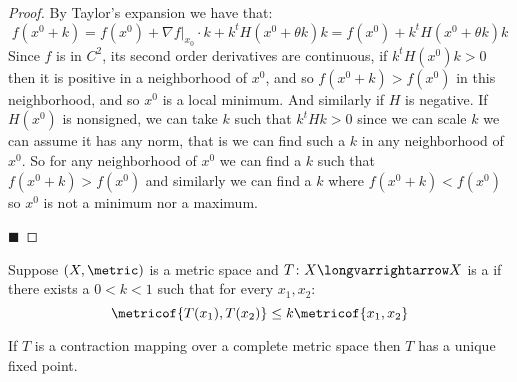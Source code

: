 \documentclass[10pt]{article}
\begin{document}
\begin{proof}

    By Taylor's expansion we have that:
    \[ f(x^0+k) = f(x^0) + \nabla f\bigl|_{x_0}\cdot k + k^tH(x^0+\theta k)k = f(x^0) + k^tH(x^0+\theta k)k \]
    Since $f$ is in $C^2$, its second order derivatives are continuous, if $k^tH(x^0)k>0$ then it is positive in a neighborhood of $x^0$, and so $f(x^0+k)>f(x^0)$ in this neighborhood, and so $x^0$ is a
    local minimum.
    And similarly if $H$ is negative.
    If $H(x^0)$ is nonsigned, we can take $k$ such that $k^tHk>0$ since we can scale $k$ we can assume it has any norm, that is we can find such a $k$ in any neighborhood of $x^0$.
    So for any neighborhood of $x^0$ we can find a $k$ such that $f(x^0+k)>f(x^0)$ and similarly we can find a $k$ where $f(x^0+k)<f(x^0)$ so $x^0$ is not a minimum nor a maximum.

    \hfill$\blacksquare$

\end{proof}

\begin{defn*}

    Suppose $(X,\metric)$ is a metric space and $T\colon X\longvarrightarrow X$ is a  if there exists a $0<k<1$ such that for every $x_1,x_2$:
    \[ \metricof{T(x_1),T(x_2)}\leq k\metricof{x_1,x_2} \]

\end{defn*}

\begin{thrm*}

    If $T$ is a contraction mapping over a complete metric space then $T$ has a unique fixed point.

\end{thrm*}
\end{document}
